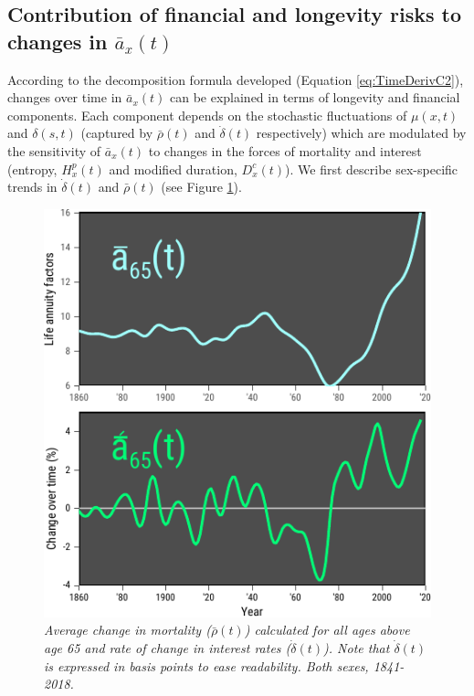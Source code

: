\documentclass[12pt]{article}
\begin{document}
\subsection{Contribution of financial and longevity risks to changes in $\bar{a}_x(t)$}

According to the decomposition formula developed (Equation \ref{eq:TimeDerivC2}), changes over time in $\bar{a}_x(t)$ can be explained in terms of longevity and financial components. Each component depends on the stochastic fluctuations of $\mu(x,t)$ and $\delta(s,t)$ (captured by $\bar{\rho}(t)$ and $\dot{\delta}(t)$ respectively) which are modulated by the sensitivity of $\bar{a}_x(t)$ to changes in the forces of mortality and interest (entropy, ${H}^{p}_x(t)$ and modified duration, ${D}^{c}_x(t)$). We first describe sex-specific trends in $\dot{\delta}(t)$ and $\bar{\rho}(t)$ (see Figure \ref{fig:Fig2}). 



\begin{figure}[!ht]
	\centering
	\includegraphics[width=1\textwidth]{Fig/Fig2}
	\caption{\textit{Average change in mortality ($\bar{\rho}(t)$) calculated for all ages above age 65 and rate of change in interest rates ($\dot{\delta}(t)$). Note that $\dot{\delta}(t)$ is expressed in basis points to ease readability. Both sexes, 1841-2018.}}
	\label{fig:Fig2}
\end{figure}
\end{document}
